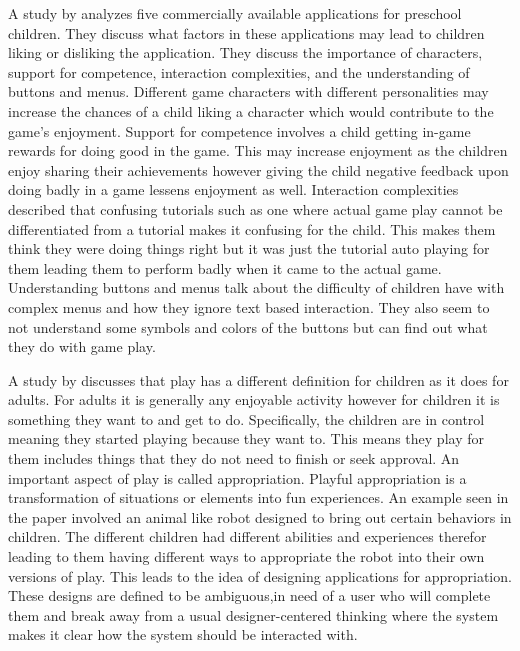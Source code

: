 A study by  analyzes five commercially available applications for preschool children. They discuss what factors in these applications may lead to children liking or disliking the application. They discuss the importance of characters, support for competence, interaction complexities, and the understanding of buttons and menus. Different game characters with different personalities may increase the chances of a child liking a character which would contribute to the game's enjoyment. Support for competence involves a child getting in-game rewards for doing good in the game. This may increase enjoyment as the children enjoy sharing their achievements however giving the child negative feedback upon doing badly in a game lessens enjoyment as well. Interaction complexities described that confusing tutorials such as one where actual game play cannot be differentiated from a tutorial makes it confusing for the child. This makes them think they were doing things right but it was just the tutorial auto playing for them leading them to perform badly when it came to the actual game. Understanding buttons and menus talk about the difficulty of children have with complex menus and how they ignore text based interaction. They also seem to not understand some symbols and colors of the buttons but can find out what they do with game play. 

A study by  discusses that play has a different definition for children as it does for adults. For adults it is generally any enjoyable activity however for children it is something they want to and get to do. Specifically, the children are in control meaning they started playing because they want to. This means they play for them includes things that they do not need to finish or seek approval. An important aspect of play is called appropriation. Playful appropriation is a transformation of situations or elements into fun experiences. An example seen in the paper involved an animal like robot designed to bring out certain behaviors in children. The different children had different abilities and experiences therefor leading to them having different ways to appropriate the robot into their own versions of play. This leads to the idea of designing applications for appropriation. These designs are defined to be ambiguous,in need of a user who will complete them and break away from a usual designer-centered thinking where the system makes it clear how the system should be interacted with. 

